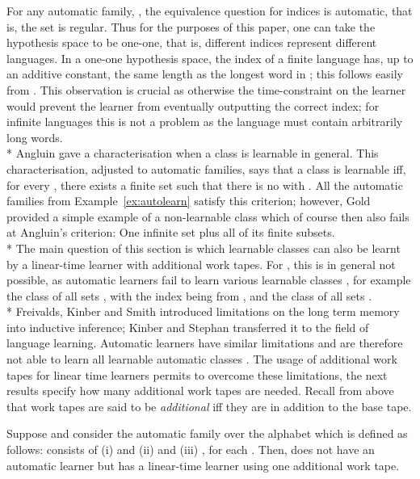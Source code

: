 \documentclass{LMCS}
\theoremstyle{plain}\newtheorem{athm}[thm]{Theorem}
\theoremstyle{plain}\newtheorem{aprop}[thm]{Proposition}
\theoremstyle{plain}\newtheorem{aprob}[thm]{Open Problem}
\theoremstyle{plain}\newtheorem{acor}[thm]{Corollary}
\theoremstyle{plain}\newtheorem{alem}[thm]{Lemma}
\theoremstyle{definition}\newtheorem{adefn}[thm]{Definition}
\theoremstyle{definition}\newtheorem{arem}[thm]{Remark}
\theoremstyle{plain}\newtheorem{aexmp}[thm]{Example}
\theoremstyle{plain}\newtheorem{aclm}[thm]{Claim}
\def\sp{\\*\indent}
\begin{document}
\noindent
For any automatic family, , 
the equivalence question for indices is automatic, that is,
the set  is regular.
Thus for the purposes of this paper, 
one can take the hypothesis space to be one-one, 
that is, different indices represent different languages.
In a one-one hypothesis space, the index  of a finite language 
has, up to an additive constant, the same length as the longest word in ;
this follows easily from \cite[Theorem 3.5]{JOPS10}.
This observation is crucial as otherwise the time-constraint on the learner
would prevent the learner from eventually outputting the correct index;
for infinite languages this is not a problem as the language must contain
arbitrarily long words.
\sp
Angluin \cite{An80} gave a characterisation when a class is learnable in 
general. This characterisation, 
adjusted to automatic families, says that a class is learnable
iff, for every , there exists a finite set 
such that there is no  with . All
the automatic families from Example~\ref{ex:autolearn} satisfy this criterion;
however, Gold \cite{Go67} provided a simple example of a non-learnable
class which of course then also fails at Angluin's criterion: One infinite
set plus all of its finite subsets.
\sp
The main question of this
section is which learnable classes can also be learnt by a linear-time learner
with  additional work tapes. For ,
this is in general not possible, as 
automatic learners fail to learn various learnable classes \cite{JLS09},
for example the class of all sets , with the index
 being from , and the class of all
sets .
\sp
Freivalds, Kinber and Smith \cite{FKS95} introduced limitations on the
long term memory into inductive inference; Kinber and Stephan \cite{KS95}
transferred it to the field of language learning. Automatic learners have
similar limitations and are therefore not able to learn all learnable
automatic classes \cite{CJLOSS11,JLS09}.
The usage of additional work tapes for linear time learners permits to
overcome these limitations, the next results specify how many additional
work tapes are needed. 
Recall from above that work tapes are said to be {\em additional\/}
iff they are in addition to
the base tape.

\begin{thm} \label{th:onetape}
Suppose  and consider the automatic family
 over the alphabet  which is defined as follows:
 consists of
(i)  and
(ii)  and 
(iii) ,
for each .
Then, 
does not have an automatic learner but has a linear-time learner using one
additional work tape.
\end{thm}
\end{document}
